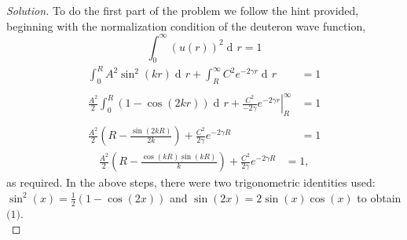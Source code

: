 \documentclass[12pt]{article}
\renewcommand{\=}[1]{\stackrel{#1}{=}} %
\DeclareMathOperator{\di}{d\!}
\newcommand*\ieval[3]{\left.#1\right\rvert_{#2}^{#3}}
\newenvironment{solution}{\begin{proof}[Solution]}{\end{proof}}
\begin{document}
    \begin{solution} 
    	To do the first part of the problem we follow the hint provided, beginning with the normalization condition of the deuteron wave function,
    	$$
    	\int_0^{\infty} \left(u(r)\right)^2 \di r = 1
    	$$
    	\begin{align*}
    	    \int_0^R A^2 \sin^2(kr) \di r + \int_R^\infty C^2 e^{-2\gamma r} \di r &= 1\\\\
    	    \frac{A^2}{2}\int_0^R \left( 1 - \cos(2kr) \right) \di r + \ieval{\frac{C^2}{-2\gamma} e^{-2\gamma r}}{R}{\infty} &= 1 \\\\
    	   \frac{A^2}{2} \left(R - \frac{\sin(2kR)}{2k}\right) + \frac{C^2}{2\gamma}e^{-2\gamma R} &= 1
    	\end{align*}
    	\begin{align}
    	    \frac{A^2}{2}\left(R - \frac{\cos(kR)\sin(kR)}{k}\right) + \frac{C^2}{2\gamma}e^{-2\gamma R} &= 1,
    	\end{align}
    	as required. In the above steps, there were two trigonometric identities used: $\sin^2(x) = \tfrac{1}{2}\left(1-\cos(2x)\right)$ and $\sin(2x) = 2\sin(x)\cos(x)$ to obtain $\text{(1)}$.\\
    	

\end{solution}
\end{document}
